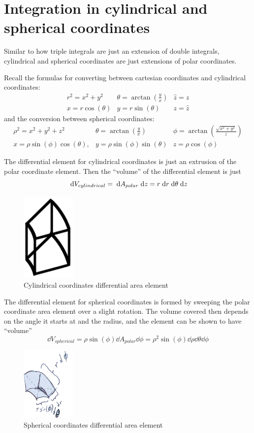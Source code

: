 \documentclass[letterpaper,11pt]{article}
\begin{document}
\section*{Integration in cylindrical and spherical coordinates}
Similar to how triple integrals are just an extension of double integrals,
cylindrical and spherical coordinates are just extensions of polar coordinates.

Recall the formulas for converting between cartesian coordinates and cylindrical coordinates:
$$
\begin{array}{ccc}
  r^2 = x^2 + y^2     & \theta = \arctan \left( \frac{y}{x} \right) & \hat{z} = z\\
  x = r \cos(\theta) & y = r \sin(\theta)                           & z = \hat{z}
\end{array}
$$
and the conversion between spherical coordinates:
$$
\begin{array}{ccc}
  \rho^2 = x^2 + y^2 + z^2 & \theta = \arctan \left( \frac{y}{x} \right) & \phi = \arctan \left( \frac{\sqrt{x^2 + y^2}}{z} \right)\\
  x = \rho \sin(\phi) \cos(\theta), & y = \rho \sin(\phi) \sin(\theta) & z = \rho \cos(\phi)
\end{array}
$$

The differential element for cylindrical coordinates is just an extrusion of the polar coordinate element.
Then the ``volume'' of the differential element is just
$$\;\mathrm{d}V_{cylindrical} = \;\mathrm{d}A_{polar} \;\mathrm{d}z = r \;\mathrm{d}r \;\mathrm{d}\theta \;\mathrm{d}z$$
\begin{figure}[h]
  \centering \includegraphics[width=100px]{mech222/worksheet_2b_cylinder_diff_elem.png}
  \caption{Cylindrical coordinates differential area element}
\end{figure}

The differential element for spherical coordinates is formed by sweeping the polar coordinate area element over a slight rotation.
The volume covered then depends on the angle it starts at and the radius, and the element can be shown to have ``volume''
$$\dd{V}_{spherical} = \rho \sin(\phi) \dd{A}_{polar} \dd{\phi} = \rho^2 \sin(\phi) \dd{\rho} \dd{\theta} \dd{\phi}$$
\begin{figure}[h]
  \centering \includegraphics[width=100px]{mech222/worksheet_2b_spherical_diff_elem.png}
  \caption{Spherical coordinates differential area element}
\end{figure}
\end{document}
